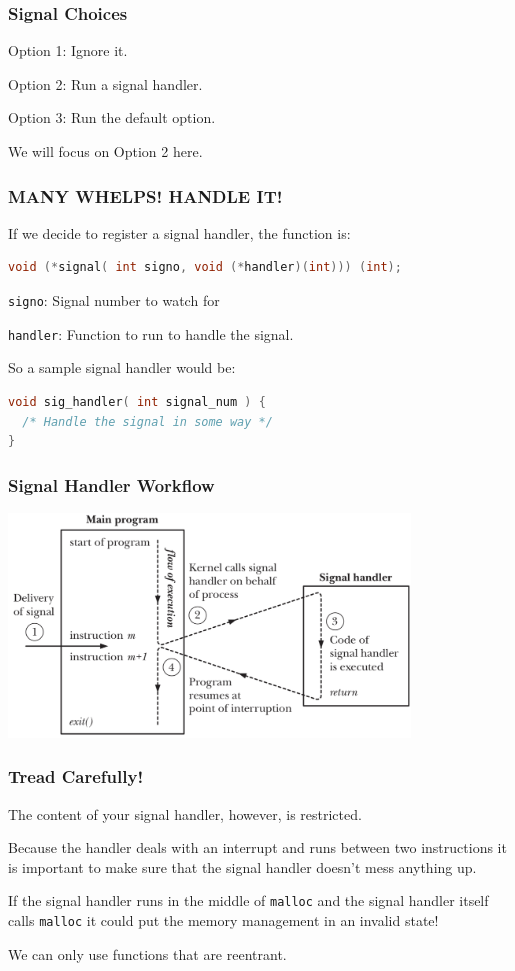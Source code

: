 \begin{frame}
\frametitle{Signal Choices}

Option 1: Ignore it.

Option 2: Run a signal handler.

Option 3: Run the default option.

We will focus on Option 2 here.

\end{frame}


\begin{frame}[fragile]
\frametitle{MANY WHELPS! HANDLE IT!}

If we decide to register a signal handler, the function is:
\begin{lstlisting}[language=C]
void (*signal( int signo, void (*handler)(int))) (int);
\end{lstlisting}

\texttt{signo}: Signal number to watch for

\texttt{handler}: Function to run to handle the signal.

So a sample signal handler would be:
\begin{lstlisting}[language=C]
void sig_handler( int signal_num ) {
  /* Handle the signal in some way */
}
\end{lstlisting}

\end{frame}


\begin{frame}
\frametitle{Signal Handler Workflow}

\begin{center}
\includegraphics[width=0.8\textwidth]{images/sighandler.png}
\end{center}


\end{frame}


\begin{frame}
\frametitle{Tread Carefully!}

The content of your signal handler, however, is restricted. 

Because the handler deals with an interrupt and runs between two instructions it is important to make sure that the signal handler doesn't mess anything up.

 If the signal handler runs in the middle of \texttt{malloc} and the signal handler itself calls \texttt{malloc} it could put the memory management in an invalid state!
 
 We can only use functions that are \alert{reentrant}.


\end{frame}


